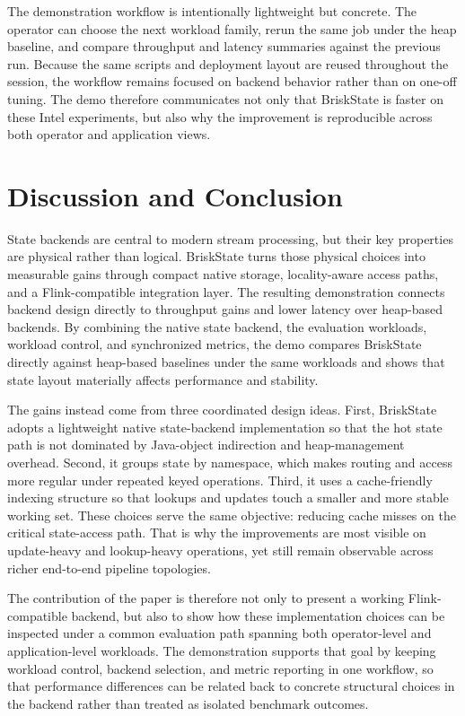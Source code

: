 \documentclass[sigconf,nonacm]{acmart}
\newcommand{\briskstate}{BriskState\xspace}
\begin{document}
The demonstration workflow is intentionally lightweight but concrete. The operator can choose the next workload family, rerun the same job under the heap baseline, and compare throughput and latency summaries against the previous run. Because the same scripts and deployment layout are reused throughout the session, the workflow remains focused on backend behavior rather than on one-off tuning. The demo therefore communicates not only that BriskState is faster on these Intel experiments, but also why the improvement is reproducible across both operator and application views.

\section{Discussion and Conclusion}
State backends are central to modern stream processing, but their key properties are physical rather than logical. \briskstate turns those physical choices into measurable gains through compact native storage, locality-aware access paths, and a Flink-compatible integration layer. The resulting demonstration connects backend design directly to throughput gains and lower latency over heap-based backends. By combining the native state backend, the evaluation workloads, workload control, and synchronized metrics, the demo compares \briskstate directly against heap-based baselines under the same workloads and shows that state layout materially affects performance and stability.

The gains instead come from three coordinated design ideas. First, \briskstate adopts a lightweight native state-backend implementation so that the hot state path is not dominated by Java-object indirection and heap-management overhead. Second, it groups state by namespace, which makes routing and access more regular under repeated keyed operations. Third, it uses a cache-friendly indexing structure so that lookups and updates touch a smaller and more stable working set. These choices serve the same objective: reducing cache misses on the critical state-access path. That is why the improvements are most visible on update-heavy and lookup-heavy operations, yet still remain observable across richer end-to-end pipeline topologies.

The contribution of the paper is therefore not only to present a working Flink-compatible backend, but also to show how these implementation choices can be inspected under a common evaluation path spanning both operator-level and application-level workloads. The demonstration supports that goal by keeping workload control, backend selection, and metric reporting in one workflow, so that performance differences can be related back to concrete structural choices in the backend rather than treated as isolated benchmark outcomes.

\balance


\end{document}
